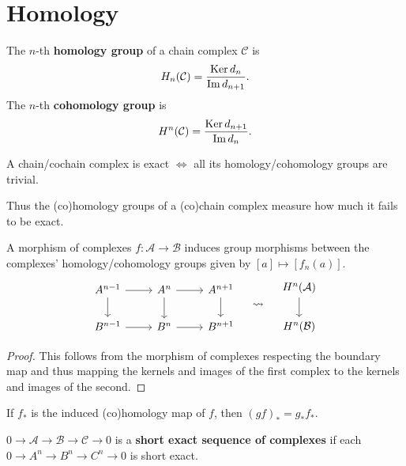 \documentclass[twoside,10pt]{report}
\begin{document}
\section{Homology}

\begin{defn}[]
The $n$-th \textbf{homology group} of a chain complex $\mathcal{C}$ is
\[
	H_{n}(\mathcal{C}) = \frac{\operatorname{Ker} d_{n}}{\operatorname{Im} d_{n+1}} .
\] The $n$-th \textbf{cohomology group} is
\[
	H^{n}(\mathcal{C}) = \frac{\operatorname{Ker} d_{n+1}}{\operatorname{Im} d_{n}} .
\] 
\end{defn}


\begin{prop}
A chain/cochain complex is exact $\iff$ all its homology/cohomology groups are trivial.
\end{prop}

Thus the (co)homology groups of a (co)chain complex measure how much it fails to be exact.

\begin{prop}
	A morphism of complexes $f:\mathcal{A}\to \mathcal{B}$ induces group morphisms between the complexes' homology/cohomology groups given by $[a] \mapsto [f_{n}(a)]$.
\[
\begin{aligned}
	\begin{tikzcd}
		A^{n-1} \rar\dar & A^{n} \rar\dar & A^{n+1} \dar \\
		B^{n-1} \rar & B^{n} \rar & B^{n+1}
	\end{tikzcd}
	\quad \leadsto \quad
	\begin{tikzcd}
		H^{n}(\mathcal{A}) \dar \\
		H^{n}(\mathcal{B})
	\end{tikzcd}
\end{aligned}
\] 
\end{prop}
\begin{proof}
	This follows from the morphism of complexes respecting the boundary map and thus mapping the kernels and images of the first complex to the kernels and images of the second.
\end{proof}

\begin{prop}
	If $f_{*}$ is the induced (co)homology map of $f$, then $(gf)_{*}=g_{*}f_{*}$.
\end{prop}

\begin{defn}[]
$0\to \mathcal{A}\to \mathcal{B}\to \mathcal{C}\to 0$ is a \textbf{short exact sequence of complexes} if each $0\to A^{n}\to B^{n}\to C^{n}\to 0$ is short exact.
\end{defn}
\end{document}
